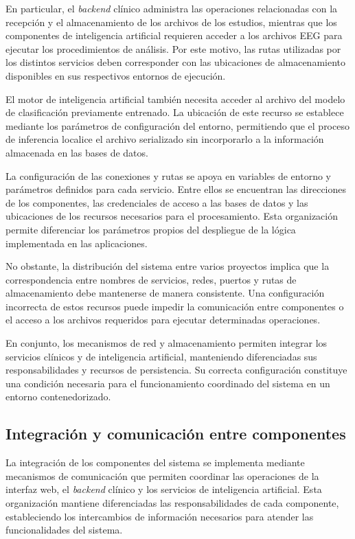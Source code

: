 En particular, el \textit{backend} clínico administra las operaciones relacionadas con la recepción y el almacenamiento de los archivos de los estudios, mientras que los componentes de inteligencia artificial requieren acceder a los archivos EEG para ejecutar los procedimientos de análisis. Por este motivo, las rutas utilizadas por los distintos servicios deben corresponder con las ubicaciones de almacenamiento disponibles en sus respectivos entornos de ejecución.


El motor de inteligencia artificial también
necesita acceder al archivo del modelo de
clasificación previamente entrenado. La ubicación
de este recurso se establece mediante los
parámetros de configuración del entorno,
permitiendo que el proceso de inferencia
localice el archivo serializado sin incorporarlo
a la información almacenada en las bases de datos.

La configuración de las conexiones y rutas
se apoya en variables de entorno y parámetros
definidos para cada servicio. Entre ellos se
encuentran las direcciones de los componentes,
las credenciales de acceso a las bases de datos
y las ubicaciones de los recursos necesarios
para el procesamiento. Esta organización permite
diferenciar los parámetros propios del despliegue
de la lógica implementada en las aplicaciones.

No obstante, la distribución del sistema entre
varios proyectos implica que la correspondencia
entre nombres de servicios, redes, puertos y
rutas de almacenamiento debe mantenerse de
manera consistente. Una configuración incorrecta
de estos recursos puede impedir la comunicación
entre componentes o el acceso a los archivos
requeridos para ejecutar determinadas operaciones.

En conjunto, los mecanismos de red y almacenamiento
permiten integrar los servicios clínicos y de
inteligencia artificial, manteniendo diferenciadas
sus responsabilidades y recursos de persistencia.
Su correcta configuración constituye una condición
necesaria para el funcionamiento coordinado del
sistema en un entorno contenedorizado.


\subsection{Integración y comunicación entre componentes}

La integración de los componentes del sistema se implementa
mediante mecanismos de comunicación que permiten coordinar
las operaciones de la interfaz web, el \textit{backend} clínico y los
servicios de inteligencia artificial. Esta organización
mantiene diferenciadas las responsabilidades de cada
componente, estableciendo los intercambios de información
necesarios para atender las funcionalidades del sistema.

